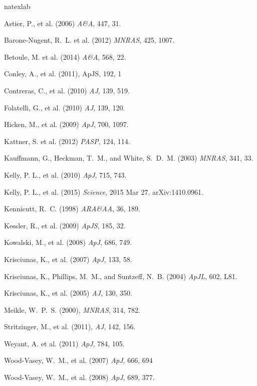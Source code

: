 \documentclass[11pt]{article}
\begin{document}
\clearpage
\begin{thebibliography}{11}
\expandafter\ifx\csname natexlab\endcsname\relax\def\natexlab#1{#1}\fi

{Astier}, P., et al. (2006) {\it A\&A}, 447, 31.

{Barone-Nugent}, R.~L. et al. (2012) {\it MNRAS}, 425, 1007.

{Betoule}, M. et al. (2014) {\it A\&A}, 568, 22.

{Conley}, A., et al. (2011), ApJS, 192, 1

{Contreras}, C., et al. (2010) {\it AJ}, 139, 519.

{Folatelli}, G., et al. (2010) {\it AJ}, 139, 120.

{Hicken}, M., et al. (2009) {\it ApJ}, 700, 1097.

{Kattner}, S. et al. (2012) {\it PASP}, 124, 114.

{Kauffmann}, G., {Heckman}, T.~M., and White, S.~D.~M. (2003) {\it MNRAS}, 341, 33.

{Kelly}, P. L., et al. (2010) {\it ApJ}, 715, 743.

{Kelly}, P. L., et al. (2015) {\it Science}, 2015 Mar 27. arXiv:1410.0961.

{Kennicutt}, R.~C. (1998) {\it ARA\&AA}, 36, 189.

{Kessler}, R., et al. (2009) {\it ApJS}, 185, 32.

{Kowalski}, M., et al. (2008) {\it ApJ}, 686, 749.

{Krisciunas}, K., et al. (2007) {\it ApJ}, 133, 58.

{Krisciunas}, K., {Phillips}, M.~M., and {Suntzeff}, N.~B. (2004) {\it ApJL}, 602, L81.

{Krisciunas}, K., et al. (2005) {\it AJ}, 130, 350.

{Meikle}, W.~P.~S. (2000), {\it MNRAS}, 314, 782.

{Stritzinger}, M., et al. (2011), {\it AJ}, 142, 156.

Weyant, A. et al. (2011) {\it ApJ}, 784, 105.

{Wood-Vasey}, W.~M., et al. (2007) {\it ApJ}, 666, 694

Wood-Vasey, W.~M., et al. (2008) {\it ApJ}, 689, 377.



\end{thebibliography}
\end{document}
